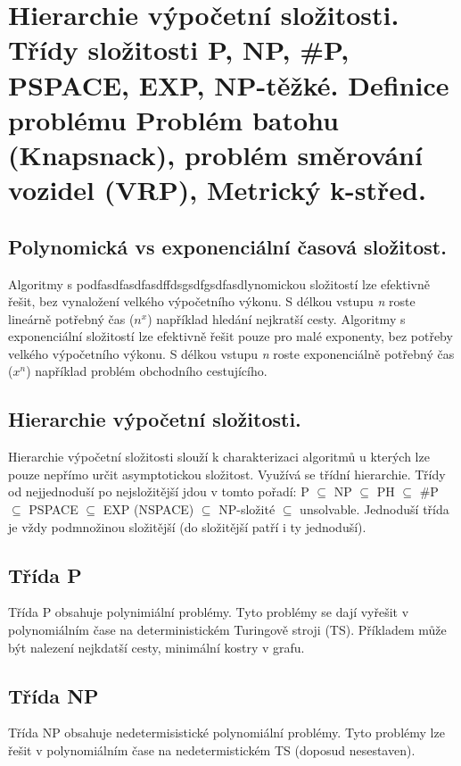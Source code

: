 \section{Hierarchie výpočetní složitosti. Třídy složitosti P, NP, \#P, PSPACE, EXP, NP-těžké. Definice problému Problém batohu (Knapsnack), problém směrování vozidel (VRP), Metrický k-střed.}

\subsection{Polynomická vs exponenciální časová složitost.}

Algoritmy s podfasdfasdfasdffdsgsdfgsdfasdlynomickou složitostí lze efektivně řešit, bez vynaložení velkého výpočetního výkonu. 
S délkou vstupu \textit{n} roste lineárně potřebný čas ($n^x$) například hledání nejkratší cesty. 
Algoritmy s exponenciální složitostí lze efektivně řešit pouze pro malé exponenty, bez potřeby velkého výpočetního výkonu. 
S délkou vstupu \textit{n} roste exponenciálně potřebný čas ($x^n$) například problém obchodního cestujícího.

\subsection{Hierarchie výpočetní složitosti.}

Hierarchie výpočetní složitosti slouží k charakterizaci algoritmů u kterých lze pouze nepřímo určit asymptotickou složitost. 
Využívá se třídní hierarchie. 
Třídy od nejjednoduší po nejsložitější jdou v tomto pořadí: P $\subseteq$ NP $\subseteq$ PH $\subseteq$ \#P $\subseteq$ PSPACE $\subseteq$ EXP (NSPACE) $\subseteq$ NP-složité $\subseteq$ unsolvable. 
Jednoduší třída je vždy podmnožinou složitější (do složitější patří i ty jednoduší).

\subsection{Třída P}

Třída P obsahuje polynimiální problémy. 
Tyto problémy se dají vyřešit v polynomiálním čase na deterministickém Turingově stroji (TS). 
Příkladem může být nalezení nejkdatší cesty, minimální kostry v grafu.

\subsection{Třída NP}

Třída NP obsahuje nedetermisistické polynomiální problémy. 
Tyto problémy lze řešit v polynomiálním čase na nedetermistickém TS (doposud nesestaven).

